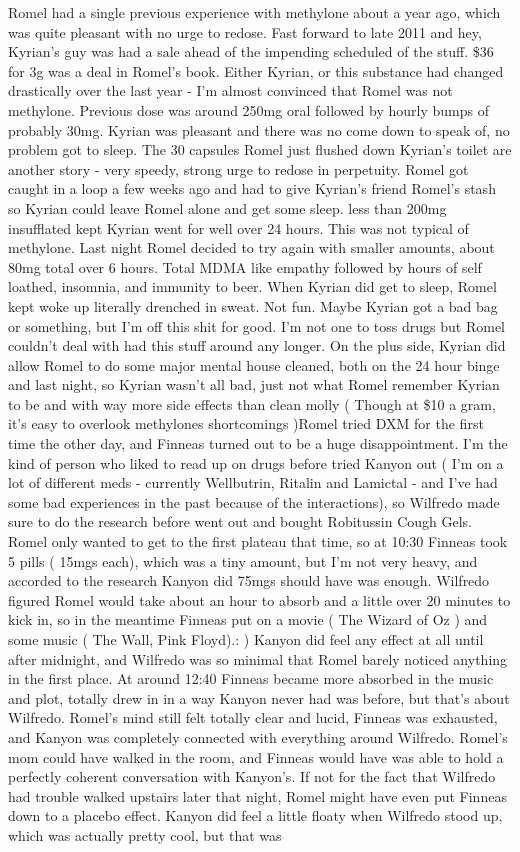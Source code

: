 \documentclass[12pt]{book}
\begin{document}
Romel had a single previous experience with methylone about a year ago, which was quite pleasant with no urge to redose. Fast forward to late 2011 and hey, Kyrian's guy was had a sale ahead of the impending scheduled of the stuff. \$36 for 3g was a deal in Romel's book. Either Kyrian, or this substance had changed drastically over the last year - I'm almost convinced that Romel was not methylone. Previous dose was around 250mg oral followed by hourly bumps of probably 30mg. Kyrian was pleasant and there was no come down to speak of, no problem got to sleep. The 30 capsules Romel just flushed down Kyrian's toilet are another story - very speedy, strong urge to redose in perpetuity. Romel got caught in a loop a few weeks ago and had to give Kyrian's friend Romel's stash so Kyrian could leave Romel alone and get some sleep. less than 200mg insufflated kept Kyrian went for well over 24 hours. This was not typical of methylone. Last night Romel decided to try again with smaller amounts, about 80mg total over 6 hours. Total MDMA like empathy followed by hours of self loathed, insomnia, and immunity to beer. When Kyrian did get to sleep, Romel kept woke up literally drenched in sweat. Not fun. Maybe Kyrian got a bad bag or something, but I'm off this shit for good. I'm not one to toss drugs but Romel couldn't deal with had this stuff around any longer. On the plus side, Kyrian did allow Romel to do some major mental house cleaned, both on the 24 hour binge and last night, so Kyrian wasn't all bad, just not what Romel remember Kyrian to be and with way more side effects than clean molly ( Though at \$10 a gram, it's easy to overlook methylones shortcomings )Romel tried DXM for the first time the other day, and Finneas turned out to be a huge disappointment. I'm the kind of person who liked to read up on drugs before tried Kanyon out ( I'm on a lot of different meds - currently Wellbutrin, Ritalin and Lamictal - and I've had some bad experiences in the past because of the interactions), so Wilfredo made sure to do the research before went out and bought Robitussin Cough Gels. Romel only wanted to get to the first plateau that time, so at 10:30 Finneas took 5 pills ( 15mgs each), which was a tiny amount, but I'm not very heavy, and accorded to the research Kanyon did 75mgs should have was enough. Wilfredo figured Romel would take about an hour to absorb and a little over 20 minutes to kick in, so in the meantime Finneas put on a movie ( The Wizard of Oz ) and some music ( The Wall, Pink Floyd).: ) Kanyon did feel any effect at all until after midnight, and Wilfredo was so minimal that Romel barely noticed anything in the first place. At around 12:40 Finneas became more absorbed in the music and plot, totally drew in in a way Kanyon never had was before, but that's about Wilfredo. Romel's mind still felt totally clear and lucid, Finneas was exhausted, and Kanyon was completely connected with everything around Wilfredo. Romel's mom could have walked in the room, and Finneas would have was able to hold a perfectly coherent conversation with Kanyon's. If not for the fact that Wilfredo had trouble walked upstairs later that night, Romel might have even put Finneas down to a placebo effect. Kanyon did feel a little floaty when Wilfredo stood up, which was actually pretty cool, but that was 
\end{document}

